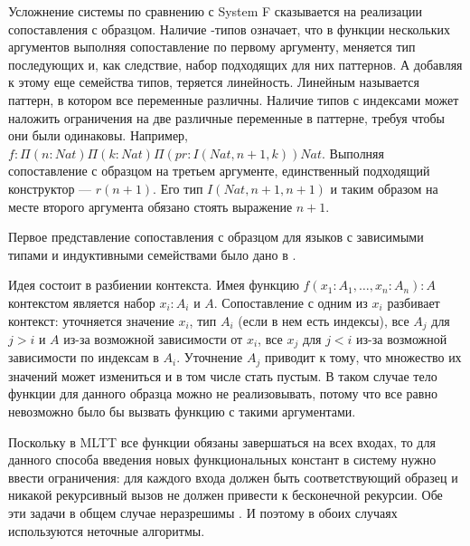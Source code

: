 \label{dependent-pattern-matching}
Усложнение системы по сравнению с System F сказывается на реализации сопоставления
с образцом. Наличие \textPi-типов означает, что в функции нескольких аргументов
выполняя сопоставление по первому аргументу, меняется тип последующих и, как
следствие, набор подходящих для них паттернов. А добавляя к этому еще семейства
типов, теряется линейность. Линейным называется паттерн, в котором все переменные
различны. Наличие типов с индексами может наложить ограничения
на две различные переменные в паттерне, требуя чтобы они были одинаковы. Например,
\(f : \Pi(n : Nat) \Pi(k : Nat) \Pi(pr : I(Nat, n + 1, k)) Nat\). Выполняя
сопоставление с образцом на третьем аргументе, единственный подходящий конструктор
--- \(r(n + 1)\). Его тип \(I(Nat, n + 1, n + 1)\) и таким образом на месте второго
аргумента обязано стоять выражение \(n + 1\).

Первое представление сопоставления с образцом для языков с зависимыми типами и
индуктивными семействами было дано в \cite{dependent-pattern-matching}.

Идея состоит в разбиении контекста. Имея функцию \(f(x_1 : A_1, \dots, x_n : A_n) : A\)
контекстом является набор \(x_i : A_i\) и \(A\). Сопоставление с одним из \(x_i\)
разбивает контекст: уточняется значение \(x_i\), тип \(A_i\) (если в нем есть
индексы), все \(A_j\) для \(j > i\) и \(A\) из-за возможной зависимости от \(x_i\),
все \(x_j\) для \(j < i\) из-за возможной зависимости по индексам в \(A_i\).
Уточнение \(A_j\) приводит к тому, что множество их значений может измениться
и в том числе стать пустым. В таком случае тело функции для данного образца
можно не реализовывать, потому что все равно невозможно было бы вызвать функцию
с такими аргументами.

Поскольку в MLTT все функции обязаны завершаться на всех входах, то для
данного способа введения новых функциональных констант в систему нужно ввести
ограничения: для каждого входа должен быть соответствующий образец и никакой
рекурсивный вызов не должен привести к бесконечной рекурсии. Обе эти задачи
в общем случае неразрешимы \cite{eliminating-dependent-pattern-matching}. И
поэтому в обоих случаях используются неточные алгоритмы.
